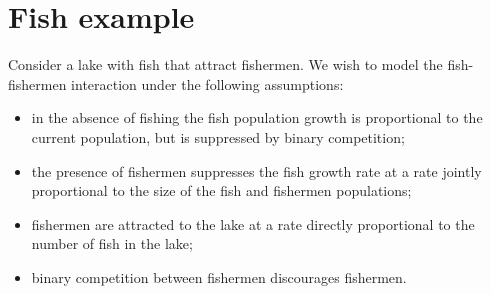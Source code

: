 \section{Fish example}
\begin{example}[frametitle=Fishing]
Consider a lake with fish that attract fishermen. We wish to model the fish-fishermen interaction under the following assumptions:
\begin{itemize}
\item in the absence of fishing the fish population growth is proportional to the current population, but is suppressed by binary competition;
\item the presence of fishermen suppresses the fish growth rate at a rate jointly proportional to the size of the fish and fishermen populations;
\item fishermen are attracted to the lake at a rate directly proportional to the number of fish in the lake;
\item binary competition between fishermen discourages fishermen.
\end{itemize}


\end{example}
